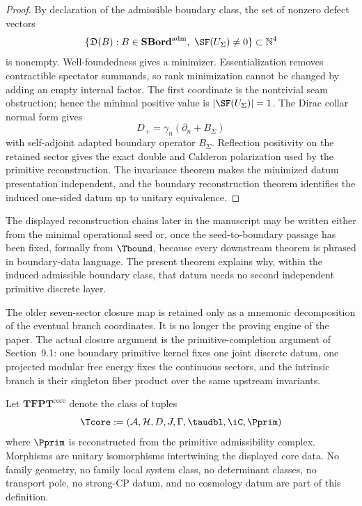 \begin{proof}
By declaration of the admissible boundary class, the set of nonzero defect vectors
\begin{equation}
\{\mathfrak D(B):B\in\mathbf{SBord}^{\mathrm{adm}},\ \SF(U_\Sigma)\neq0\}\subset\mathbb N^4
\end{equation}
is nonempty. Well-foundedness gives a minimizer. Essentialization removes contractible spectator
summands, so rank minimization cannot be changed by adding an empty internal factor. The first
coordinate is the nontrivial seam obstruction; hence the minimal positive value is
$|\SF(U_\Sigma)|=1$. The Dirac collar normal form gives
\begin{equation}
D_+=\gamma_n(\partial_n+B_\Sigma)
\end{equation}
with self-adjoint adapted boundary operator $B_\Sigma$. Reflection positivity on the retained
sector gives the exact double and Calderon polarization used by the primitive reconstruction. The
invariance theorem makes the minimized datum presentation independent, and the boundary
reconstruction theorem identifies the induced one-sided datum up to unitary equivalence.
\end{proof}
\begin{remark}
The displayed reconstruction chains later in the manuscript may be written either from the minimal
operational seed or, once the seed-to-boundary passage has been fixed, formally from $\Tbound$,
because every downstream theorem is phrased in boundary-data language. The present theorem explains
why, within the induced admissible boundary class, that datum needs no second independent primitive
discrete layer.
\end{remark}

\begin{remark}
The older seven-sector closure map is retained only as a mnemonic decomposition of the eventual
branch coordinates. It is no longer the proving engine of the paper. The actual closure argument is
the primitive-completion argument of Section~9.1: one boundary primitive kernel fixes one joint
discrete datum, one projected modular free energy fixes the continuous sectors, and the intrinsic
branch is their singleton fiber product over the same upstream invariants.
\end{remark}

\begin{definition}
\label{def:tfpt-core-class}
Let $\mathbf{TFPT}^{\mathrm{core}}$ denote the class of tuples
\[
\Tcore:=(\mathcal A,\mathcal H,D,J,\Gamma,\taudbl,\iC,\Pprim)
\]
where $\Pprim$ is reconstructed from the primitive admissibility complex. Morphisms are unitary
isomorphisms intertwining the displayed core data. No family geometry, no family local system
class, no determinant classes, no transport pole, no strong-CP datum, and no cosmology datum are
part of this definition.
\end{definition}

